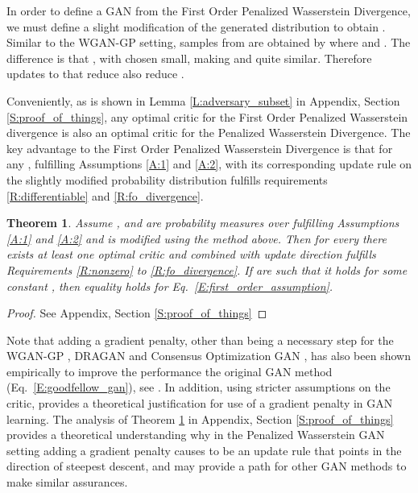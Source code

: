 \documentclass{article}
\newtheorem{theorem}{Theorem}
\begin{document}
 In order to define a GAN from the First Order Penalized Wasserstein Divergence, we must define a slight modification of
 the generated distribution  to obtain . Similar to the WGAN-GP setting,
 samples from  are obtained by  where  and .
 The difference is that , with  chosen small, making 
 and  quite similar. Therefore updates to  that reduce  also reduce
 .
 
 Conveniently, as is shown in Lemma \ref{L:adversary_subset} in Appendix, Section \ref{S:proof_of_things},
 any optimal critic for the First Order Penalized Wasserstein divergence
 is also an optimal critic for the Penalized Wasserstein Divergence.  
 The key advantage to the First Order Penalized Wasserstein Divergence is that for any ,  fulfilling Assumptions \ref{A:1}
 and \ref{A:2},  with its corresponding update rule
  on the slightly modified probability distribution 
  fulfills requirements \ref{R:differentiable} and \ref{R:fo_divergence}.
 

 \begin{theorem}\label{T:fogan_theorem}
  Assume , and  are probability measures over
   fulfilling Assumptions \ref{A:1} and \ref{A:2} and  is  modified
  using the method above.
  Then for every  there exists at least one optimal critic 
  and  combined with update direction  fulfills 
  Requirements \ref{R:nonzero} to \ref{R:fo_divergence}. If  are such that 
  it holds  for some constant , then equality holds for Eq.\ \ref{E:first_order_assumption}.
 \end{theorem}
 \begin{proof}
  See Appendix, Section \ref{S:proof_of_things}
 \end{proof}


 Note that adding a gradient penalty, other than being a necessary step for the WGAN-GP \cite{gulrajani2017improved}, 
 DRAGAN \cite{dragan} and Consensus Optimization GAN \cite{mescheder2017numerics},
 has also been shown empirically to improve the performance the original GAN method (Eq.\ \ref{E:goodfellow_gan}),
 see \cite{fedus2017many}. In addition, using stricter assumptions on the critic, \cite{nagarajan2017gradient} provides a theoretical justification for 
 use of a gradient penalty in GAN learning.
 The analysis of Theorem \ref{T:fogan_theorem} in Appendix, Section \ref{S:proof_of_things} provides a theoretical understanding
 why in the Penalized Wasserstein GAN setting adding a gradient penalty causes 
 to be an update rule that points in the direction of steepest descent, and may provide a path for other GAN methods to make similar assurances.
\end{document}
